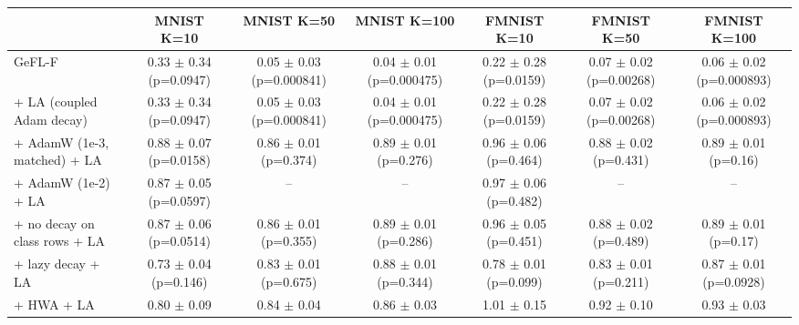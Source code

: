 \begin{tabular}{lcccccc}
\toprule
 & MNIST K=10 & MNIST K=50 & MNIST K=100 & FMNIST K=10 & FMNIST K=50 & FMNIST K=100 \\
\midrule
GeFL-F & 0.33 $\pm$ 0.34 (p=0.0947) & 0.05 $\pm$ 0.03 (p=0.000841) & 0.04 $\pm$ 0.01 (p=0.000475) & 0.22 $\pm$ 0.28 (p=0.0159) & 0.07 $\pm$ 0.02 (p=0.00268) & 0.06 $\pm$ 0.02 (p=0.000893) \\
+ LA (coupled Adam decay) & 0.33 $\pm$ 0.34 (p=0.0947) & 0.05 $\pm$ 0.03 (p=0.000841) & 0.04 $\pm$ 0.01 (p=0.000475) & 0.22 $\pm$ 0.28 (p=0.0159) & 0.07 $\pm$ 0.02 (p=0.00268) & 0.06 $\pm$ 0.02 (p=0.000893) \\
+ AdamW (1e-3, matched) + LA & 0.88 $\pm$ 0.07 (p=0.0158) & 0.86 $\pm$ 0.01 (p=0.374) & 0.89 $\pm$ 0.01 (p=0.276) & 0.96 $\pm$ 0.06 (p=0.464) & 0.88 $\pm$ 0.02 (p=0.431) & 0.89 $\pm$ 0.01 (p=0.16) \\
+ AdamW (1e-2) + LA & 0.87 $\pm$ 0.05 (p=0.0597) & -- & -- & 0.97 $\pm$ 0.06 (p=0.482) & -- & -- \\
+ no decay on class rows + LA & 0.87 $\pm$ 0.06 (p=0.0514) & 0.86 $\pm$ 0.01 (p=0.355) & 0.89 $\pm$ 0.01 (p=0.286) & 0.96 $\pm$ 0.05 (p=0.451) & 0.88 $\pm$ 0.02 (p=0.489) & 0.89 $\pm$ 0.01 (p=0.17) \\
+ lazy decay + LA & 0.73 $\pm$ 0.04 (p=0.146) & 0.83 $\pm$ 0.01 (p=0.675) & 0.88 $\pm$ 0.01 (p=0.344) & 0.78 $\pm$ 0.01 (p=0.099) & 0.83 $\pm$ 0.01 (p=0.211) & 0.87 $\pm$ 0.01 (p=0.0928) \\
+ HWA + LA & 0.80 $\pm$ 0.09 & 0.84 $\pm$ 0.04 & 0.86 $\pm$ 0.03 & 1.01 $\pm$ 0.15 & 0.92 $\pm$ 0.10 & 0.93 $\pm$ 0.03 \\
\bottomrule
\end{tabular}
